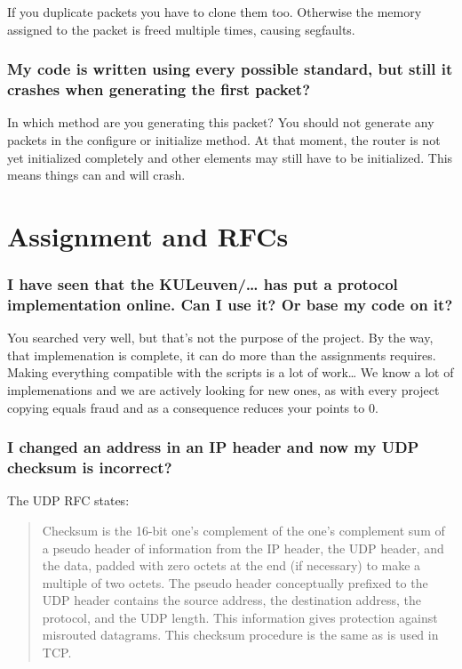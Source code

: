 \documentclass[a4paper]{article}
\begin{document}
If you duplicate packets you have to clone them too. Otherwise the
memory assigned to the packet is freed multiple times, causing
segfaults.

\subsubsection*{My code is written using every possible standard, but still it crashes
when generating the first packet?}

In which method are you generating this packet? You should not generate
any packets in the configure or initialize method. At that moment, the
router is not yet initialized completely and other elements may still
have to be initialized. This means things can and will crash.

\section{Assignment and RFCs}

\subsubsection*{I have seen that the KULeuven/\ldots{} has put a protocol implementation
online. Can I use it? Or base my code on it?}

You searched very well, but that's not the purpose of the project. By
the way, that implemenation is complete, it can do more than the
assignments requires. Making everything compatible with the scripts is a
lot of work\ldots{} We know a lot of implemenations and we are actively
looking for new ones, as with every project copying equals fraud and as
a consequence reduces your points to 0.

\subsubsection*{I changed an address in an IP header and now my UDP checksum is
incorrect?}

The UDP RFC states:

\begin{quote}
Checksum is the 16-bit one's complement of the one's complement sum of a
pseudo header of information from the IP header, the UDP header, and the
data, padded with zero octets at the end (if necessary) to make a
multiple of two octets. The pseudo header conceptually prefixed to the
UDP header contains the source address, the destination address, the
protocol, and the UDP length. This information gives protection against
misrouted datagrams. This checksum procedure is the same as is used in
TCP.
\end{quote}
\end{document}
